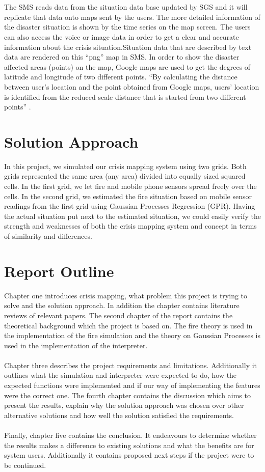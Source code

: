 \\\\
The SMS reads data from the situation data base updated by SGS and it will replicate that data onto maps sent by the users. The more detailed information of the disaster situation is shown by the time series on the map screen. The users can also access the voice or image data  in order to get a clear and accurate information about the crisis situation.Situation data that are described by text data are rendered on this “png” map in SMS. In order to show the disaster affected areas (points) on the map, Google maps are used to get the degrees of latitude and longitude of two different points. “By calculating the distance between user’s location and the point obtained from Google maps, users’ location is identified from the reduced scale distance that is started from two different points” \cite{springlink}.

\section{Solution Approach}

In this project, we simulated our crisis mapping system using two grids. Both grids represented the same area (any area) divided into equally sized squared cells. In the first grid, we let fire and mobile phone sensors spread freely over the cells. In the second grid, we estimated the fire situation based on mobile sensor readings from the first grid using Gaussian Processes Regression (GPR). Having the actual situation put next to the estimated situation, we could easily verify the strength and weaknesses of both the crisis mapping system and concept in terms of similarity and differences.

\section{Report Outline}

Chapter one introduces crisis mapping, what problem this project is trying to solve and the solution approach. In addition the chapter contains literature reviews of relevant papers. The second chapter of the report contains the theoretical background which the project is based on. The fire theory is used in the implementation of the fire simulation and the theory on Gaussian Processes is used in the implementation of the interpreter.
\\\\
Chapter three describes the project requirements and limitations. Additionally it outlines what the simulation and interpreter were expected to do, how the expected functions were implemented and if our way of implementing the features were the correct one. The fourth chapter contains the discussion which aims to present the results, explain why the solution approach was chosen over other alternative solutions and how well the solution satisfied the requirements.
\\\\
Finally, chapter five contains the conclusion. It endeavours to determine whether the results makes a difference to existing solutions and what the benefits are for system users. Additionally it contains proposed next steps if the project were to be continued.